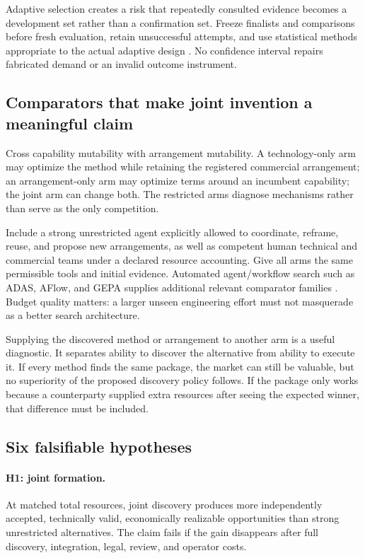 \documentclass[11pt,letterpaper]{article}
\theoremstyle{remark}\newtheorem{remark}{Remark}[section]
\begin{document}
Adaptive selection creates a risk that repeatedly consulted evidence becomes a development set rather than a confirmation set. Freeze finalists and comparisons before fresh evaluation, retain unsuccessful attempts, and use statistical methods appropriate to the actual adaptive design \citep{dwork2014,howard2021}. No confidence interval repairs fabricated demand or an invalid outcome instrument.

\subsection{Comparators that make joint invention a meaningful claim}
Cross capability mutability with arrangement mutability. A technology-only arm may optimize the method while retaining the registered commercial arrangement; an arrangement-only arm may optimize terms around an incumbent capability; the joint arm can change both. The restricted arms diagnose mechanisms rather than serve as the only competition.

Include a strong unrestricted agent explicitly allowed to coordinate, reframe, reuse, and propose new arrangements, as well as competent human technical and commercial teams under a declared resource accounting. Give all arms the same permissible tools and initial evidence. Automated agent/workflow search such as ADAS, AFlow, and GEPA supplies additional relevant comparator families \citep{hu2024,zhang2024,agrawal2025}. Budget quality matters: a larger unseen engineering effort must not masquerade as a better search architecture.

Supplying the discovered method or arrangement to another arm is a useful diagnostic. It separates ability to discover the alternative from ability to execute it. If every method finds the same package, the market can still be valuable, but no superiority of the proposed discovery policy follows. If the package only works because a counterparty supplied extra resources after seeing the expected winner, that difference must be included.

\subsection{Six falsifiable hypotheses}
\paragraph{H1: joint formation.} At matched total resources, joint discovery produces more independently accepted, technically valid, economically realizable opportunities than strong unrestricted alternatives. The claim fails if the gain disappears after full discovery, integration, legal, review, and operator costs.
\end{document}
